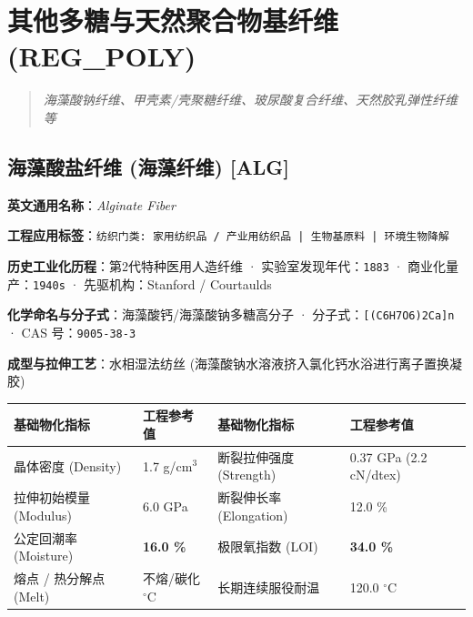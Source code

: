 \documentclass[11pt,openright,twoside,UTF8]{ctexbook}
\begin{document}
\chapter{其他多糖与天然聚合物基纤维 (REG\_POLY)}
\begin{quote}
\small\itshape
海藻酸钠纤维、甲壳素/壳聚糖纤维、玻尿酸复合纤维、天然胶乳弹性纤维等
\end{quote}

\section{海藻酸盐纤维 (海藻纤维) [ALG]}
\label{sec:alg}

\noindent\textbf{英文通用名称}：\textit{Alginate Fiber}\par
\noindent\textbf{工程应用标签}：\texttt{纺织门类: 家用纺织品 / 产业用纺织品 | 生物基原料 | 环境生物降解}\par
\noindent\textbf{历史工业化历程}：第2代特种医用人造纤维 · 实验室发现年代：\texttt{1883} · 商业化量产：\texttt{1940s} · 先驱机构：Stanford / Courtaulds\par
\noindent\textbf{化学命名与分子式}：海藻酸钙/海藻酸钠多糖高分子 · 分子式：\texttt{[(C6H7O6)2Ca]n} · CAS 号：\texttt{9005-38-3}\par
\noindent\textbf{成型与拉伸工艺}：水相湿法纺丝 (海藻酸钠水溶液挤入氯化钙水浴进行离子置换凝胶)\par

\vspace{0.15cm}
\begin{center}
\small
\begin{tabularx}{\textwidth}{p{3.8cm}Xp{3.8cm}X}
\toprule
\textbf{基础物化指标} & \textbf{工程参考值} & \textbf{基础物化指标} & \textbf{工程参考值} \\
\midrule
晶体密度 (Density) & 1.7 g/cm$^3$ & 断裂拉伸强度 (Strength) & 0.37 GPa (2.2 cN/dtex) \\
拉伸初始模量 (Modulus) & 6.0 GPa & 断裂伸长率 (Elongation) & 12.0 \% \\
公定回潮率 (Moisture) & \textbf{16.0 \%} & 极限氧指数 (LOI) & \textbf{34.0 \%} \\
熔点 / 热分解点 (Melt) & 不熔/碳化 $^\circ\mathrm{C}$ & 长期连续服役耐温 & 120.0 $^\circ\mathrm{C}$ \\
\bottomrule
\end{tabularx}
\end{center}
\vspace{0.15cm}
\end{document}
